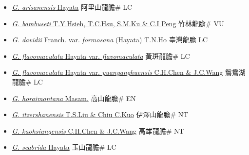 \begin{itemize}
  \begin{itemize}
        \item[] \href{http://www.theplantlist.org/tpl1.1/search?q=Gentiana+arisanensis}{\textit{G. arisanensis} Hayata}   阿里山龍膽\# LC
        \item[] \href{http://www.theplantlist.org/tpl1.1/search?q=Gentiana+bambuseti}{\textit{G. bambuseti} T.Y.Hsieh, T.C.Hsu, S.M.Ku \& C.I Peng}   竹林龍膽\# VU
        \item[] \href{http://www.theplantlist.org/tpl1.1/search?q=Gentiana+davidii+var.+formosana}{\textit{G. davidii} Franch. var. \textit{formosana} (Hayata) T.N.Ho}   臺灣龍膽 LC
        \item[] \href{http://www.theplantlist.org/tpl1.1/search?q=Gentiana+flavomaculata+var.+flavomaculata}{\textit{G. flavomaculata} Hayata var. \textit{flavomaculata}}   黃斑龍膽\# LC
        \item[] \href{http://www.theplantlist.org/tpl1.1/search?q=Gentiana+flavomaculata+var.+yuanyanghuensis}{\textit{G. flavomaculata} Hayata var. \textit{yuanyanghuensis} C.H.Chen \& J.C.Wang}   鴛鴦湖龍膽\# LC
        \item[] \href{http://www.theplantlist.org/tpl1.1/search?q=Gentiana+horaimontana}{\textit{G. horaimontana} Masam.}   高山龍膽\# EN
        \item[] \href{http://www.theplantlist.org/tpl1.1/search?q=Gentiana+itzershanensis}{\textit{G. itzershanensis} T.S.Liu \& Chiu C.Kuo}   伊澤山龍膽\# NT
        \item[] \href{http://www.theplantlist.org/tpl1.1/search?q=Gentiana+kaohsiungensis}{\textit{G. kaohsiungensis} C.H.Chen \& J.C.Wang}   高雄龍膽\# NT
        \item[] \href{http://www.theplantlist.org/tpl1.1/search?q=Gentiana+scabrida}{\textit{G. scabrida} Hayata}   玉山龍膽\# LC

\end{itemize}
\end{itemize}
